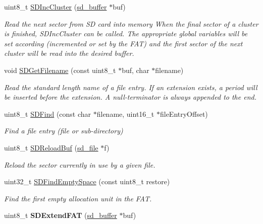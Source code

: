 \begin{DoxyCompactItemize}
uint8\-\_\-t \hyperlink{group__sd__private_gab285932fa74b07785e7f749ab7954605}{\-S\-D\-Inc\-Cluster} (\hyperlink{struct__sd__buffer}{sd\-\_\-buffer} $\ast$buf)
\begin{DoxyCompactList}\small\item\em \-Read the next sector from \-S\-D card into memory  \-When the final sector of a cluster is finished, \-S\-D\-Inc\-Cluster can be called. \-The appropriate global variables will be set according (incremented or set by the \-F\-A\-T) and the first sector of the next cluster will be read into the desired buffer. \end{DoxyCompactList}\item 
void \hyperlink{group__sd__private_ga58df1c4a441a09559fdeefa8830b2ba3}{\-S\-D\-Get\-Filename} (const uint8\-\_\-t $\ast$buf, char $\ast$filename)
\begin{DoxyCompactList}\small\item\em \-Read the standard length name of a file entry. \-If an extension exists, a period will be inserted before the extension. \-A null-\/terminator is always appended to the end. \end{DoxyCompactList}\item 
uint8\-\_\-t \hyperlink{group__sd__private_gab95a217c5576c70a2c0e0e49cacf21cd}{\-S\-D\-Find} (const char $\ast$filename, uint16\-\_\-t $\ast$file\-Entry\-Offset)
\begin{DoxyCompactList}\small\item\em \-Find a file entry (file or sub-\/directory) \end{DoxyCompactList}\item 
uint8\-\_\-t \hyperlink{group__sd__private_ga5bf131742ae27e3a88ef3e1de6f53342}{\-S\-D\-Reload\-Buf} (\hyperlink{struct__sd__file}{sd\-\_\-file} $\ast$f)
\begin{DoxyCompactList}\small\item\em \-Reload the sector currently in use by a given file. \end{DoxyCompactList}\item 
uint32\-\_\-t \hyperlink{group__sd__private_gaa8845c0c0998c4a31711acf0505b6551}{\-S\-D\-Find\-Empty\-Space} (const uint8\-\_\-t restore)
\begin{DoxyCompactList}\small\item\em \-Find the first empty allocation unit in the \-F\-A\-T. \end{DoxyCompactList}\item 
\hypertarget{group__sd__private_ga5c2c9c5b5a3771a4eede0d98ee6b31c8}{uint8\-\_\-t {\bfseries \-S\-D\-Extend\-F\-A\-T} (\hyperlink{struct__sd__buffer}{sd\-\_\-buffer} $\ast$buf)}\label{group__sd__private_ga5c2c9c5b5a3771a4eede0d98ee6b31c8}


\end{DoxyCompactItemize}
